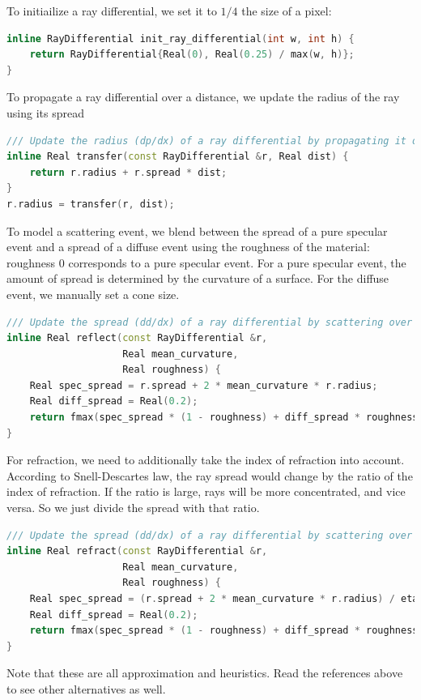 To initiailize a ray differential, we set it to $1/4$ the size of a pixel:
\begin{lstlisting}[language=c++]
inline RayDifferential init_ray_differential(int w, int h) {
    return RayDifferential{Real(0), Real(0.25) / max(w, h)};
}
\end{lstlisting}

To propagate a ray differential over a distance, we update the radius of the ray using its spread
\begin{lstlisting}[language=c++]
/// Update the radius (dp/dx) of a ray differential by propagating it over a distance.
inline Real transfer(const RayDifferential &r, Real dist) {
    return r.radius + r.spread * dist;
}
r.radius = transfer(r, dist);
\end{lstlisting}

To model a scattering event, we blend between the spread of a pure specular event and a spread of a diffuse event using the roughness of the material: roughness 0 corresponds to a pure specular event.
For a pure specular event, the amount of spread is determined by the curvature of a surface.
For the diffuse event, we manually set a cone size.
\begin{lstlisting}[language=c++]
/// Update the spread (dd/dx) of a ray differential by scattering over a reflective surface.
inline Real reflect(const RayDifferential &r,
                    Real mean_curvature,
                    Real roughness) {
    Real spec_spread = r.spread + 2 * mean_curvature * r.radius;
    Real diff_spread = Real(0.2);
    return fmax(spec_spread * (1 - roughness) + diff_spread * roughness, Real(0));
}
\end{lstlisting}

For refraction, we need to additionally take the index of refraction into account. According to Snell-Descartes law, the ray spread would change by the ratio of the index of refraction. If the ratio is large, rays will be more concentrated, and vice versa. So we just divide the spread with that ratio.
\begin{lstlisting}[language=c++]
/// Update the spread (dd/dx) of a ray differential by scattering over a reflective surface.
inline Real refract(const RayDifferential &r,
                    Real mean_curvature,
                    Real roughness) {
    Real spec_spread = (r.spread + 2 * mean_curvature * r.radius) / eta;
    Real diff_spread = Real(0.2);
    return fmax(spec_spread * (1 - roughness) + diff_spread * roughness, Real(0));
}
\end{lstlisting}
Note that these are all approximation and heuristics. Read the references above to see other alternatives as well.

